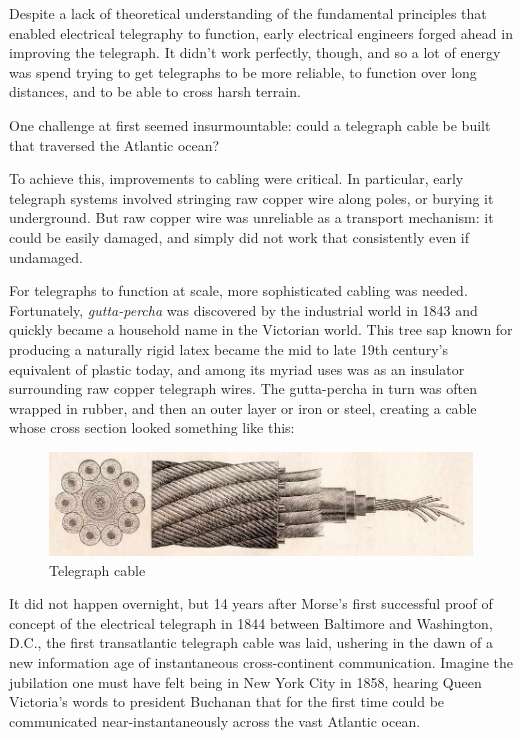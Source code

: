 \documentclass[UTF8]{book}
\begin{document}
\begin{CJK}{UTF8}{gbsn}
Despite a lack of theoretical understanding of the fundamental principles that enabled electrical telegraphy to function, early electrical engineers forged ahead in improving the telegraph. It didn't work perfectly, though, and so a lot of energy was spend trying to get telegraphs to be more reliable, to function over long distances, and to be able to cross harsh terrain.

One challenge at first seemed insurmountable: could a telegraph cable be built that traversed the Atlantic ocean?

To achieve this, improvements to cabling were critical. In particular, early telegraph systems involved stringing raw copper wire along poles, or burying it underground. But raw copper wire was unreliable as a transport mechanism: it could be easily damaged, and simply did not work that consistently even if undamaged.

For telegraphs to function at scale, more sophisticated cabling was needed. Fortunately, \emph{gutta-percha} was discovered by the industrial world in 1843 and quickly became a household name in the Victorian world. This tree sap known for producing a naturally rigid latex became the mid to late 19th century's equivalent of plastic today, and among its myriad uses was as an insulator surrounding raw copper telegraph wires. The gutta-percha in turn was often wrapped in rubber, and then an outer layer or iron or steel, creating a cable whose cross section looked something like this:

\begin{figure}[H]
\centering
\includegraphics[width=0.8\linewidth]{cable-cross-section}
\caption{Telegraph cable}
\end{figure}

It did not happen overnight, but 14 years after Morse's first successful proof of concept of the electrical telegraph in 1844 between Baltimore and Washington, D.C., the first transatlantic telegraph cable was laid, ushering in the dawn of a new information age of instantaneous cross-continent communication. Imagine the jubilation one must have felt being in New York City in 1858, hearing Queen Victoria's words to president Buchanan that for the first time could be communicated near-instantaneously across the vast Atlantic ocean.


\end{CJK}
\end{document}
